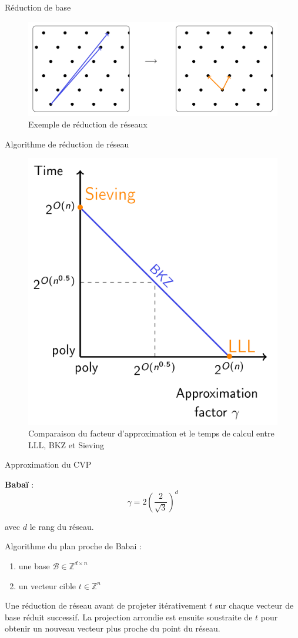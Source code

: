 \documentclass{backend/backend}
\begin{document}
\begin{frame}{Réduction de base}

\begin{figure}
    \centering
    \includegraphics[width=0.8\linewidth]{img/reseaux/Screenshot 2025-02-20 at 10-55-09 Lattice reduction algorithms - cryptanalysis.pdf.png}
    \caption{Exemple de réduction de réseaux \cite{AlicePelletMary}}
    \label{fig:exempleReseau}
\end{figure}
    
\end{frame}


\begin{frame}{Algorithme de réduction de réseau}
    \begin{figure}
        \centering
        \includegraphics[width=0.34\linewidth]{img/reseaux/Screenshot 2025-02-20 at 10-56-37 Lattice reduction algorithms - cryptanalysis.pdf.png}
        \caption{Comparaison du facteur d'approximation et le temps de calcul entre LLL, BKZ et Sieving \cite{AlicePelletMary}}
        \label{fig:algoReduc}
    \end{figure}
\end{frame}


\begin{frame}{Approximation du CVP}

    \Large{ \textbf{Babaï}} \normalsize :\\
    
    $$ \gamma = 2\left(\frac{2}{\sqrt{3}}\right)^d $$

    avec $d$ le rang du réseau.\smallbreak

    Algorithme du plan proche de Babai :
    \begin{enumerate}
        \item une base \(\mathcal{B} \in \mathbb{Z}^{d \times n}\)
        \item un vecteur cible \(t \in \mathbb{Z}^n\)
    \end{enumerate}
    Une réduction de réseau avant de projeter itérativement \(t\) sur chaque vecteur de base réduit successif. La projection arrondie est ensuite soustraite de \(t\) pour obtenir un nouveau vecteur plus proche du point du réseau.
    
\end{frame}
\end{document}
